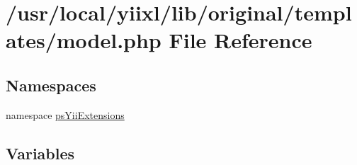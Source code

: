 \hypertarget{templates_2model_8php}{
\section{/usr/local/yiixl/lib/original/templates/model.php File Reference}
\label{templates_2model_8php}
}
\subsection*{Namespaces}
\begin{DoxyCompactItemize}
\item 
namespace \hyperlink{namespacepsYiiExtensions}{psYiiExtensions}
\end{DoxyCompactItemize}
\subsection*{Variables}
